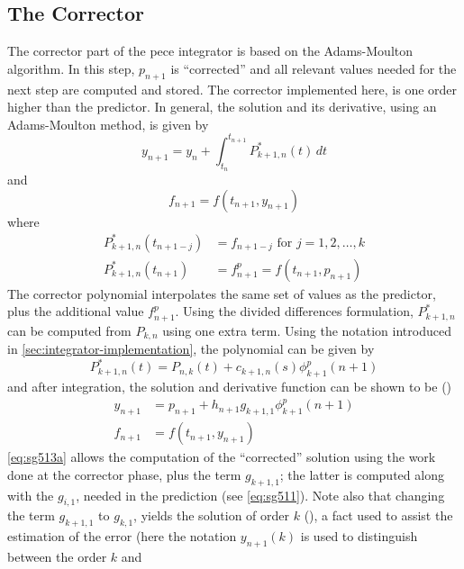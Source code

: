 \subsection{The Corrector}\label{ssec:integrator-corrector}
The corrector part of the \gls{pece} integrator is based on the Adams-Moulton 
algorithm. In this step, $p_{n+1}$ is ``corrected'' and all relevant values 
needed for the next step are computed and stored. The corrector implemented here, 
is one order higher than the predictor. In general, the solution and its derivative, 
using an Adams-Moulton method, is given by
\begin{equation}\label{eq:sg5cor1}
  y_{n+1} = y_n + \int_{t_n}^{t_{n+1}} P^{*}_{k+1,n}(t) \,dt
\end{equation}
and
\begin{equation}\label{eq:sg51b}
  f_{n+1} = f(t_{n+1}, y_{n+1})
\end{equation}
where 
\begin{align}
  P^{*}_{k+1,n}(t_{n+1-j}) &= f_{n+1-j} \mbox{ for } j=1,2,\dots ,k \\
  P^{*}_{k+1,n}(t_{n+1})   &= f^{p}_{n+1} = f(t_{n+1}, p_{n+1})
\end{align}
The corrector polynomial interpolates the same set of values as the predictor, plus 
the additional value $f^{p}_{n+1}$. Using the divided differences formulation, 
$P^{*}_{k+1,n}$ can be computed from $P_{k,n}$ using one extra term. Using the 
notation introduced in \autoref{sec:integrator-implementation}, the polynomial 
can be given by
\begin{equation}
  P^{*}_{k+1,n}(t) = P_{n,k}(t) + c_{k+1,n}(s) \phi ^{p}_{k+1}(n+1)
\end{equation}
and after integration, the solution and derivative function can be shown to be 
(\cite{Shampine1975})
\begin{align}
  y_{n+1} &= p_{n+1} + h_{n+1} g_{k+1,1} \phi ^{p}_{k+1} (n+1) \label{eq:sg513a} \\
  f_{n+1} &= f(t_{n+1}, y_{n+1}) \label{eq:sg513b}
\end{align}
\autoref{eq:sg513a} allows the computation of the ``corrected'' solution using the 
work done at the corrector phase, plus the term $g_{k+1,1}$; the latter is computed 
along with the $g_{i,1}$, needed in the prediction (see \autoref{eq:sg511}). Note 
also that changing the term $g_{k+1,1}$ to $g_{k,1}$, yields the solution of 
order $k$ (\cite{Shampine1975}), a fact used to assist the estimation of the error 
(here the notation $y_{n+1}(k)$ is used to distinguish between the order $k$ and 
